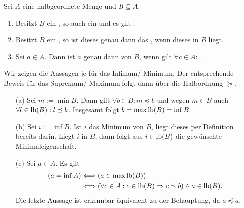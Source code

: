 \documentclass[../../main.tex]{subfiles}
\begin{document}
\begin{pro}\label{12.1.7}
	Sei $A$ eine halbgeordnete Menge und $B\subseteq A$.
	\begin{enumerate}[\normalfont(a)]
		\item Besitzt $B$ ein , so auch ein  und es gilt .
		\item Besitzt $B$ ein , so ist dieses genau dann das , wenn dieses in $B$ liegt.
		\item Sei $a\in A$. Dann ist $a$ genau dann  von $B$, wenn gilt $\forall c\in A:$ .
	\end{enumerate}
\end{pro}
\begin{cproof} 
	Wir zeigen die Aussagen je für das Infimum/ Minimum. Der entsprechende Beweis für das Supremum/ Maximum folgt dann über die Halbordnung $\succeq$.
	\begin{itemize}
		\item[(a)] Sei $m:=\min B$. Dann gilt $\forall b\in B: m\preceq b$ und wegen $m\in B$ auch $\forall l\in \operatorname{lb}(B): l\preceq b$. Insgesamt folgt $b=\max\operatorname{lb}(B)=\inf B$.
		\item[(b)] Sei $i:= \inf B$. Ist $i$ das Minimum von $B$, liegt dieses per Definition bereits darin. Liegt $i$ in $B$, dann folgt aus $i\in\operatorname{lb}(B)$ die gewünschte Minimaleigenschaft.
		\item[(c)] Sei $a\in A$. Es gilt
		\begin{align*}
			(a=\inf A)&\Longleftrightarrow (a\in\max \operatorname{lb}(B))\\
			&\Longleftrightarrow (\forall c\in A: c\in\operatorname{lb}(B)\Rightarrow c\preceq b)\land a\in \operatorname{lb}(B).
		\end{align*}
		Die letzte Aussage ist erkennbar äquivalent zu der Behauptung, da $a\preceq a$.
	\end{itemize}
\end{cproof}
\end{document}
